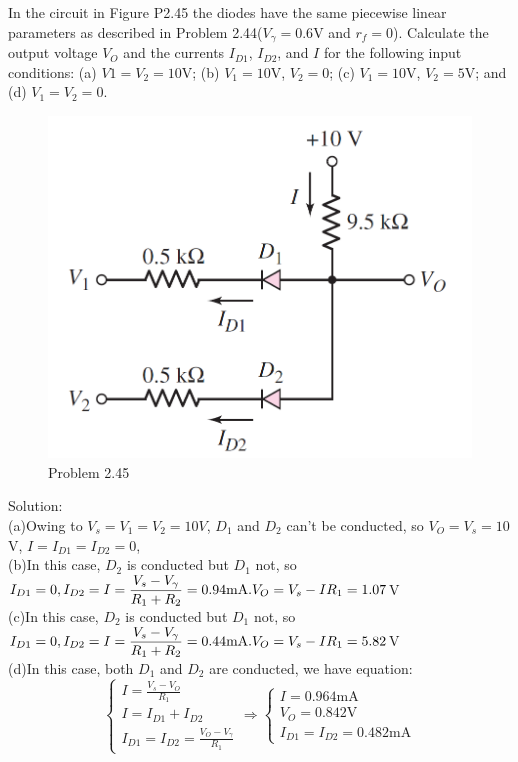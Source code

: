 \documentclass[a4paper,11pt,UTF8]{article}
\begin{document}
 In the circuit in Figure P2.45 the diodes have the same piecewise linear parameters
as described in Problem 2.44($V_\gamma = 0.6$V and $r_f = 0$). Calculate the output voltage $V_O$ and
the currents $I_{D1}$, $I_{D2}$, and $I$ for the following input conditions: (a) $V1 =
V_2 = 10 $V; (b) $V_1 = 10$V, $V_2 = 0$; (c) $V_1 = 10 $V, $V_2 = 5$V; and (d)
$V_1 = V_2 = 0$.
\begin{figure}[H] 
	\centering 
	\includegraphics[scale=0.25]{MD2.45.png}
	\caption{Problem 2.45}
\end{figure}
\noindent Solution:\\
(a)Owing to $V_s=V_1=V_2=10V$, $D_1$ and $D_2$ can't be conducted, so $V_O=V_s=10$V, $I = I_{D1} = I_{D2} = 0$, \\
(b)In this case,  $D_2$ is conducted but $D_1$ not, so $\displaystyle I_{D1}= 0, I_{D2}=I=\frac{V_s-V_\gamma}{R_1+R_2}=0.94\text{mA}.\\ V_O=V_s-IR_1=1.07$V\\
(c)In this case,  $D_2$ is conducted but $D_1$ not, so $\displaystyle I_{D1}= 0, I_{D2}=I=\frac{V_s-V_\gamma}{R_1+R_2}=0.44\text{mA}.\\ V_O=V_s-IR_1=5.82$V\\
(d)In this case,  both $D_1$ and $D_2$ are conducted, we have equation:
$$\begin{cases}
	\displaystyle I=\frac{V_s-V_O}{R_1}\\
	\displaystyle I=I_{D1}+I_{D2}\\
	\displaystyle I_{D1}=I_{D2}=\frac{V_O-V_\gamma}{R_1}
\end{cases}\Rightarrow
\begin{cases}
	I = 0.964 \text{mA}\\
	V_O = 0.842 \text{V}\\
	I_{D1} = I_{D2} = 0.482 \text{mA}
\end{cases}
$$
\end{document}
